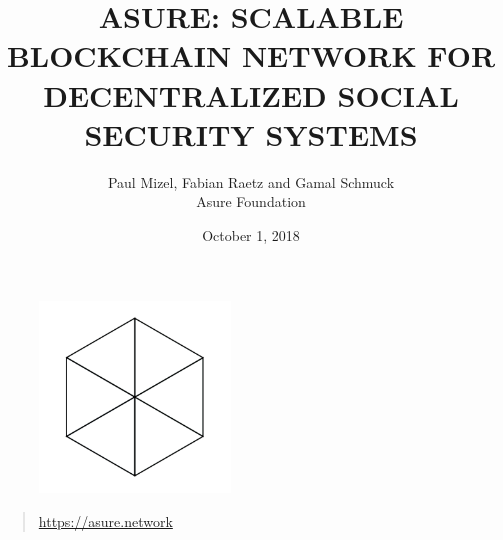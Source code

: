 \begin{figure}
    \centering
    \includegraphics[width=2.0in]{img/logo.png}
\end{figure}

\title{ASURE: SCALABLE BLOCKCHAIN NETWORK FOR DECENTRALIZED SOCIAL SECURITY SYSTEMS}
\author{Paul Mizel, Fabian Raetz and Gamal Schmuck \\Asure Foundation}
\date{October 1, 2018}
\maketitle

\vskip 2.5in

\begin{quote}
	\centering
	\url{https://asure.network}
\end{quote}

\newpage 
